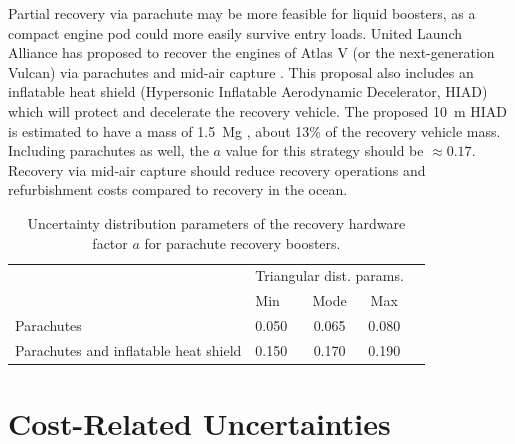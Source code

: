 \documentclass[conf]{../new-aiaa}
\begin{document}
Partial recovery via parachute may be more feasible for liquid boosters, as a compact engine pod could more easily survive entry loads. United Launch Alliance has proposed to recover the engines of Atlas V (or the next-generation Vulcan) via parachutes and mid-air capture \cite{Gravlee2008, Ragab2015}. This proposal also includes an inflatable heat shield (Hypersonic Inflatable Aerodynamic Decelerator, HIAD) which will protect and decelerate the recovery vehicle. The proposed \SI{10}{\meter} HIAD is estimated to have a mass of \SI{1.5}{\mega\gram} \cite{Bose2009}, about 13\% of the recovery vehicle mass. Including parachutes as well, the $a$ value for this strategy should be $\approx 0.17$. Recovery via mid-air capture should reduce recovery operations and refurbishment costs compared to recovery in the ocean.

\begin{table}[hbt!]
    \centering
    \caption{\label{tab:parachute_pref_factor_distributions} Uncertainty distribution parameters of the recovery hardware factor $a$ for parachute recovery boosters.}
    \begin{tabular}{l l c c c}
    \hline
     & \multicolumn{3}{c}{Triangular dist. params.} \\
     & Min & Mode & Max \\
    \hline
    \hline
    Parachutes & 0.050 & 0.065 & 0.080 \\
    Parachutes and inflatable heat shield  & 0.150 & 0.170 & 0.190 \\
    \hline
    \end{tabular}
\end{table}

\section{Cost-Related Uncertainties}




\end{document}
